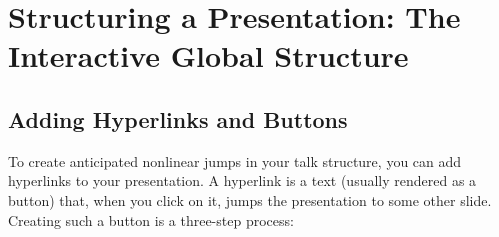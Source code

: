 %
%
%


\section{Structuring a Presentation: The Interactive Global Structure}
\label{section-nonlinear}

\subsection{Adding Hyperlinks and Buttons}

To create anticipated nonlinear jumps in your talk structure, you can add hyperlinks to your presentation. A hyperlink is a text (usually rendered as a button) that, when you click on it, jumps the presentation to some other slide. Creating such a button is a three-step process:


